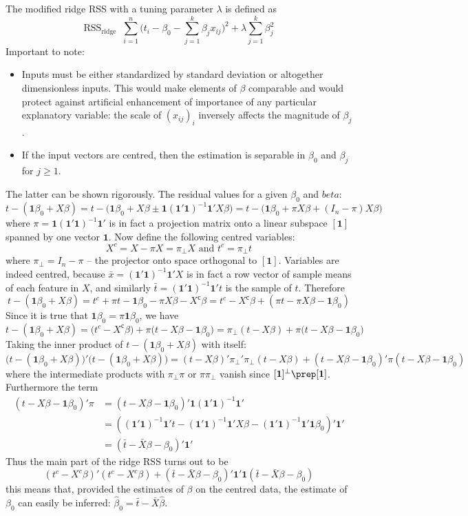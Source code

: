 \documentclass[a4paper]{article}
\newcommand{\RSS}{\text{RSS}}
\newcommand{\one}{\mathbf{1}}
\newcommand{\defn}{\mathop{\overset{\Delta}{=}}\nolimits}
\begin{document}
The modified ridge RSS with a tuning parameter $\lambda$ is defined as
\[
\RSS_\text{ridge} \defn \sum_{i=1}^n \bigl( t_i - \beta_0 - \sum_{j=1}^k \beta_j x_{ij} \bigr)^2 + \lambda \sum_{j=1}^k \beta_j^2
\]
Important to note: \begin{itemize}
	\item Inputs must be either standardized by standard deviation or altogether
	dimensionless inputs. This would make elements of $\beta$ comparable and would
	protect against artificial enhancement of importance of any particular explanatory
	variable: the scale of $(x_{ij})_i$ inversely affects the magnitude of $\beta_j$.
	\item If the input vectors are centred, then the estimation is separable in
	$\beta_0$ and $\beta_j$ for $j\geq 1$.
\end{itemize}
The latter can be shown rigorously. The residual values for a given
$\beta_0$ and $beta$:
\[
t-(\one\beta_0 + X\beta)
= t-\bigl(\one\beta_0 + X\beta \pm \one(\one'\one)^{-1}\one'X\beta \bigr)
= t-\bigl(\one\beta_0 + \pi X\beta + (I_n-\pi)X\beta \bigr)
\]
where $\pi = \one(\one'\one)^{-1}\one'$ is in fact a projection matrix onto a
linear subspace $[\one]$ spanned by one vector $\one$. Now define the following
centred variables:
\[X^c = X - \pi X = \pi_\perp X \text{ and } t^c = \pi_\perp t\]
where $\pi_\perp = I_n-\pi$ -- the projector onto space orthogonal to $[\one]$.
Variables are indeed centred, because $\bar{x} = (\one'\one)^{-1}\one'X$ is in
fact a row vector of sample means of each feature in $X$, and similarly
$\bar{t} = (\one'\one)^{-1}\one't$ is the sample of $t$. Therefore
\[
t-(\one\beta_0 + X\beta)
= t^c + \pi t - \one\beta_0 - \pi X\beta - X^с\beta
= t^c - X^с\beta + (\pi t - \pi X\beta - \one\beta_0)
\]
Since it is true that $\one\beta_0 = \pi \one\beta_0$, we have
\[
t-(\one\beta_0 + X\beta)
= \bigl(t^c - X^с\beta\bigr) + \pi\bigl( t - X\beta - \one\beta_0\bigr)
= \pi_\perp(t - X\beta) + \pi\bigl( t - X\beta - \one\beta_0\bigr)
\]
Taking the inner product of $t-(\one\beta_0 + X\beta)$ with itself:
\[
\bigl(t-(\one\beta_0 + X\beta)\bigr)'\bigl(t-(\one\beta_0 + X\beta)\bigr) 
= (t - X\beta)'\pi_\perp'\pi_\perp(t - X\beta) + (t - X\beta - \one\beta_0)'\pi(t - X\beta - \one\beta_0)
\]
where the intermediate products with $\pi_\perp \pi$ or $\pi \pi_\perp$ vanish
since $[\one]^\perp \prep [\one]$. Furthermore the term
\begin{align*}
(t - X\beta - \one\beta_0)'\pi
&= (t - X\beta - \one\beta_0)'\one(\one'\one)^{-1}\one'\\
&= ((\one'\one)^{-1}\one't - (\one'\one)^{-1}\one'X\beta - (\one'\one)^{-1}\one'\one\beta_0)'\one'\\
&= (\bar{t} - \bar{X}\beta - \beta_0)'\one'
\end{align*}
Thus the main part of the ridge RSS turns out to be
\[
(t^c - X^c\beta)'(t^c - X^c\beta) + (\bar{t} - \bar{X}\beta - \beta_0)'\one'\one(\bar{t} - \bar{X}\beta - \beta_0)
\]
this means that, provided the estimates of $\beta$ on the centred data, the estimate
of $\beta_0$ can easily be inferred: $\hat{\beta}_0 = \bar{t} - \bar{X}\hat{\beta}$.
\end{document}
